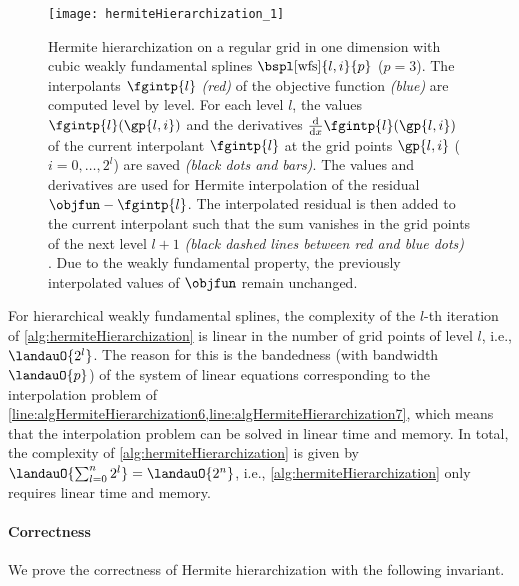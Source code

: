 \begin{SCfigure}
  \texttt{[image: hermiteHierarchization\_1]}%
  \caption[%
    Hermite hierarchization%
  ]{%
    Hermite hierarchization on a regular grid in one dimension
    with cubic weakly fundamental splines $\bspl[\wfs]{l,i}{p}$ ($p = 3$).
    The interpolants $\fgintp{l}$ \emph{\textcolor{C1}{(red)}}
    of the objective function \emph{\textcolor{C0}{(blue)}}
    are computed level by level.
    For each level $l$,
    the values $\fgintp{l}(\gp{l,i})$ and the derivatives
    $\frac{\diff}{\dx} \fgintp{l}(\gp{l,i})$ of the
    current interpolant $\fgintp{l}$ at the
    grid points $\gp{l,i}$ ($i = 0, \dotsc, 2^l$) are saved
    \emph{(black dots and bars)}.
    The values and derivatives are used for Hermite interpolation
    of the residual $\objfun - \fgintp{l}$.
    The interpolated residual is then added to the current interpolant
    such that the sum vanishes in the grid points of the next level $l + 1$
    \emph{%
      (black dashed lines between \textcolor{C1}{red} and
      \textcolor{C0}{blue} dots)%
    }.
    Due to the weakly fundamental property, the previously
    interpolated values of $\objfun$ remain unchanged.%
  }%
  \label{fig:hermiteHierarchization}%
\end{SCfigure}

For hierarchical weakly fundamental splines,
the complexity of the $l$-th iteration of \cref{alg:hermiteHierarchization}
is linear in the number of grid points of level $l$, i.e., $\landauO{2^l}$.
The reason for this is the bandedness (with bandwidth $\landauO{p}$) of the
system of linear equations corresponding to the interpolation problem of
\cref{line:algHermiteHierarchization6,line:algHermiteHierarchization7},
which means that the interpolation problem can be solved in
linear time and memory.
In total, the complexity of \cref{alg:hermiteHierarchization} is
given by $\landauO{\sum_{l=0}^n 2^l} = \landauO{2^n}$, i.e.,
\cref{alg:hermiteHierarchization} only requires linear time and memory.

\paragraph{Correctness}

We prove the correctness of Hermite hierarchization
with the following invariant.

